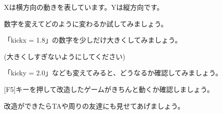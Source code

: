 Xは横方向の動きを表しています。Yは縦方向です。

数字を変えてどのように変わるか試してみましょう。


\begin{description}
    \item {}
\end{description}



「kickx = 1.8」の数字を少しだけ大きくしてみましょう。

(大きくしすぎないようにしてください)

「kicky = 2.0」なども変えてみると、どうなるか確認してみましょう。



[F5]キーを押して改造したゲームがきちんと動くか確認しましょう。

改造ができたらTAや周りの友達にも見せてあげましょう。










